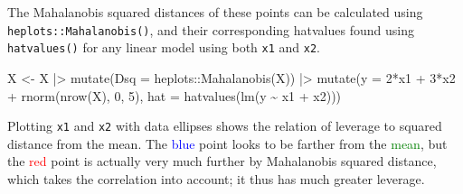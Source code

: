 \documentclass[
  letterpaper,
  10pt,
  krantz2]{krantz}
\makeatletter
\newenvironment{Shaded}{\begin{snugshade}}{\end{snugshade}}
\newcommand{\AttributeTok}[1]{\textcolor[rgb]{0.40,0.45,0.13}{#1}}
\newcommand{\DecValTok}[1]{\textcolor[rgb]{0.68,0.00,0.00}{#1}}
\newcommand{\FunctionTok}[1]{\textcolor[rgb]{0.28,0.35,0.67}{#1}}
\newcommand{\NormalTok}[1]{\textcolor[rgb]{0.00,0.23,0.31}{#1}}
\newcommand{\OtherTok}[1]{\textcolor[rgb]{0.00,0.23,0.31}{#1}}
\newcommand{\SpecialCharTok}[1]{\textcolor[rgb]{0.37,0.37,0.37}{#1}}
\newenvironment{kframe}{%
  \medskip{}
  \setlength{\fboxsep}{.8em}
  \def\at@end@of@kframe{}%
  \ifinner\ifhmode%
  \def\at@end@of@kframe{\end{minipage}}%
  \begin{minipage}{\columnwidth}%
  \fi\fi%
  \def\FrameCommand##1{\hskip\@totalleftmargin \hskip-\fboxsep
  \colorbox{shadecolor}{##1}\hskip-\fboxsep
      \hskip-\linewidth \hskip-\@totalleftmargin \hskip\columnwidth}%
  \MakeFramed {\advance\hsize-\width
    \@totalleftmargin\z@ \linewidth\hsize
    \@setminipage}}%
{\par\unskip\endMakeFramed%
  \at@end@of@kframe}
\renewenvironment{Shaded}{\begin{kframe}}{\end{kframe}}
\makeatother
\begin{document}
The Mahalanobis squared distances of these points can be calculated
using \texttt{heplots::Mahalanobis()}, and their corresponding hatvalues
found using \texttt{hatvalues()} for any linear model using both
\texttt{x1} and \texttt{x2}.

\begin{Shaded}
\begin{Highlighting}[]
\NormalTok{X }\OtherTok{\textless{}{-}}\NormalTok{ X }\SpecialCharTok{|\textgreater{}}
  \FunctionTok{mutate}\NormalTok{(}\AttributeTok{Dsq =}\NormalTok{ heplots}\SpecialCharTok{::}\FunctionTok{Mahalanobis}\NormalTok{(X)) }\SpecialCharTok{|\textgreater{}}
  \FunctionTok{mutate}\NormalTok{(}\AttributeTok{y =} \DecValTok{2}\SpecialCharTok{*}\NormalTok{x1 }\SpecialCharTok{+} \DecValTok{3}\SpecialCharTok{*}\NormalTok{x2 }\SpecialCharTok{+} \FunctionTok{rnorm}\NormalTok{(}\FunctionTok{nrow}\NormalTok{(X), }\DecValTok{0}\NormalTok{, }\DecValTok{5}\NormalTok{),}
         \AttributeTok{hat =} \FunctionTok{hatvalues}\NormalTok{(}\FunctionTok{lm}\NormalTok{(y }\SpecialCharTok{\textasciitilde{}}\NormalTok{ x1 }\SpecialCharTok{+}\NormalTok{ x2))) }
\end{Highlighting}
\end{Shaded}

Plotting \texttt{x1} and \texttt{x2} with data ellipses shows the
relation of leverage to squared distance from the mean. The
\textcolor{blue}{blue} point looks to be farther from the
\textcolor{green}{mean}, but the \textcolor{red}{red} point is actually
very much further by Mahalanobis squared distance, which takes the
correlation into account; it thus has much greater leverage.
\end{document}
